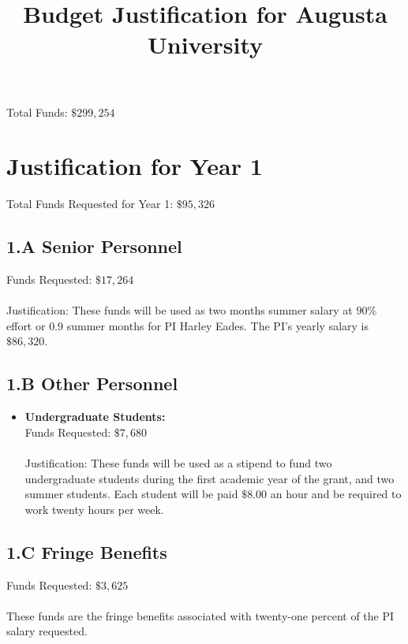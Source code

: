 \documentclass[11pt]{article}
\title{\vspace{-50px}Budget Justification for Augusta University}
\date{\vspace{-60px}}
\begin{document}
\maketitle  

\noindent
Total Funds: $\$299,254$\\
\vspace{-20px}
\section{Justification for Year 1}
\label{sec:year_1}
Total Funds Requested for Year 1: $\$95,326$\\
\vspace{-20px}
\subsection*{1.A Senior Personnel}
\label{subsec:a_senior_personnel}

Funds Requested: $\$17,264$\\ \ \\ Justification: These funds will be
used as two months summer salary at $90\%$ effort or $0.9$ summer
months for PI Harley Eades.  The PI's yearly salary is $\$86,320$.

\subsection*{1.B Other Personnel}
\label{subsec:personnel}
\begin{itemize}

\item \textbf{Undergraduate Students:}\\ Funds Requested:
  $\$7,680$\\ \ \\ Justification: These funds will be used as a
  stipend to fund two undergraduate students during the first academic
  year of the grant, and two summer students.  Each student will be
  paid $\$8.00$ an hour and be required to work twenty hours per week.
\end{itemize}

\subsection*{1.C Fringe Benefits}
\label{subsec:c_fringe_benefits}
Funds Requested: $\$3,625$\\
\ \\
These funds are the fringe benefits associated with twenty-one percent
of the PI salary requested.
\end{document}

